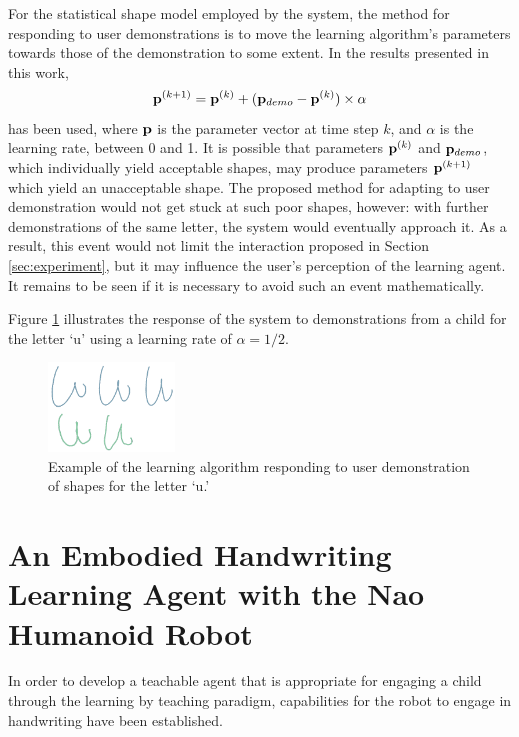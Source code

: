 \documentclass{sig-alternate}
\begin{document}
For the statistical shape model employed by the system, the method for
responding to user demonstrations is to move the learning algorithm's parameters
towards those of the demonstration to some extent. In the results presented in
this work, \[{\bf p}^{(k+1)} = {\bf p}^{(k)} + ({\bf p}_{demo}-{\bf
p}^{(k)})\times\alpha\] has been used, where ${\bf p}$ is the parameter vector
at time step $k$, and $\alpha$ is the learning rate, between 0 and 1.  It is
possible that parameters ${\bf p}^{(k)}$ and ${\bf p}_{demo}$, which
individually yield acceptable shapes, may produce parameters ${\bf p}^{(k+1)}$
which yield an unacceptable shape. The proposed method for adapting to user
demonstration would not get stuck at such poor shapes, however: with further
demonstrations of the same letter, the system would eventually approach it. As a
result, this event would not limit the interaction proposed in Section
\ref{sec:experiment}, but it may influence the user's perception of the learning
agent. It remains to be seen if it is necessary to avoid such an event
mathematically.

Figure \ref{fig:demonstrationShapes2} illustrates the response of the system to
demonstrations from a child for the letter `u' using a learning rate of
$\alpha=1/2$. 

\begin{figure}[thpb]
    \centering
    \includegraphics[width=0.3\textwidth]{figures/u_kids.png}
    \caption{\label{fig:demonstrationShapes2}Example of the learning algorithm
    responding to user demonstration of shapes for the letter `u.'}
\end{figure}

%
%



\section{An Embodied Handwriting Learning Agent with the Nao Humanoid Robot} \label{sec:robotWriting}

In order to develop a teachable agent that is appropriate for engaging a child
through the learning by teaching paradigm, 
capabilities for the robot to engage in handwriting have been established.
\end{document}
